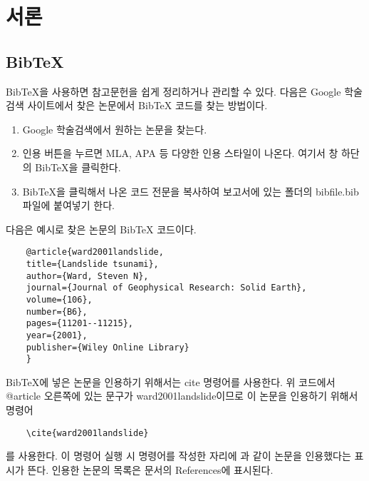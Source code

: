 \section{서론}

\subsection{BibTeX}

BibTeX을 사용하면 참고문헌을 쉽게 정리하거나 관리할 수 있다. 다음은 Google 학술검색 사이트에서 찾은 논문에서 BibTeX 코드를 찾는 방법이다.

\begin{enumerate}
	\item Google 학술검색에서 원하는 논문을 찾는다.
	\item 인용 버튼을 누르면 MLA, APA 등 다양한 인용 스타일이 나온다. 여기서 창 하단의 BibTeX을 클릭한다.
	\item BibTeX을 클릭해서 나온 코드 전문을 복사하여 보고서에 있는 폴더의 bibfile.bib 파일에 붙여넣기 한다.
\end{enumerate}

다음은 예시로 찾은 논문의 BibTeX 코드이다.
\begin{lstlisting}
	@article{ward2001landslide,
	title={Landslide tsunami},
	author={Ward, Steven N},
	journal={Journal of Geophysical Research: Solid Earth},
	volume={106},
	number={B6},
	pages={11201--11215},
	year={2001},
	publisher={Wiley Online Library}
	}
\end{lstlisting}

BibTeX에 넣은 논문을 인용하기 위해서는 cite 명령어를 사용한다. 위 코드에서 @article 오른쪽에 있는 문구가 ward2001landslide이므로 이 논문을 인용하기 위해서 명령어
\begin{lstlisting}
	\cite{ward2001landslide}
\end{lstlisting}
를 사용한다. 이 명령어 실행 시 명령어를 작성한 자리에 \cite{ward2001landslide}과 같이 논문을 인용했다는 표시가 뜬다. 인용한 논문의 목록은 문서의 References에 표시된다.